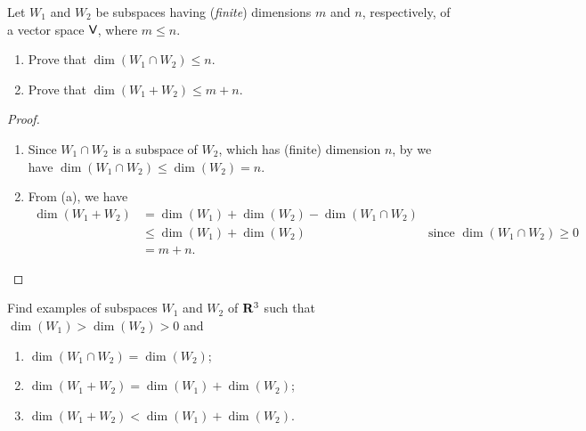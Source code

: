 \begin{exercise} \label{exercise 1.6.31}
Let \(W_1\) and \(W_2\) be subspaces having (\emph{finite}) dimensions \(m\) and \(n\), respectively, of a vector space \(\textsf{V}\), where \(m \le n\).
\begin{enumerate}
\item Prove that \(\dim(W_1 \cap W_2) \le n\).
\item Prove that \(\dim(W_1 + W_2) \le m + n\).
\end{enumerate}
\end{exercise}

\begin{proof} \ 

\begin{enumerate}
\item Since \(W_1 \cap W_2\) is a subspace of \(W_2\), which has (finite) dimension \(n\), by  we have \(\dim(W_1 \cap W_2) \le \dim(W_2) = n\).
\item From (a), we have
    \begin{align*}
        \dim(W_1 + W_2) & = \dim(W_1) + \dim(W_2) - \dim(W_1 \cap W_2) \\
                        & \le \dim(W_1) + \dim(W_2) & \text{since \(\dim(W_1 \cap W_2) \ge 0\)} \\
                        & = m + n.
    \end{align*}
\end{enumerate}
\end{proof}

\begin{exercise} \label{exercise 1.6.32}
Find examples of subspaces \(W_1\) and \(W_2\) of \(\mathbf{R}^3\) such that \(\dim(W_1) > \dim(W_2) > 0\) and
\begin{enumerate}
\item \(\dim(W_1 \cap W_2) = \dim(W_2)\);
\item \(\dim(W_1 + W_2) = \dim(W_1) + \dim(W_2)\);
\item \(\dim(W_1 + W_2) < \dim(W_1) + \dim(W_2)\).
\end{enumerate}
\end{exercise}

